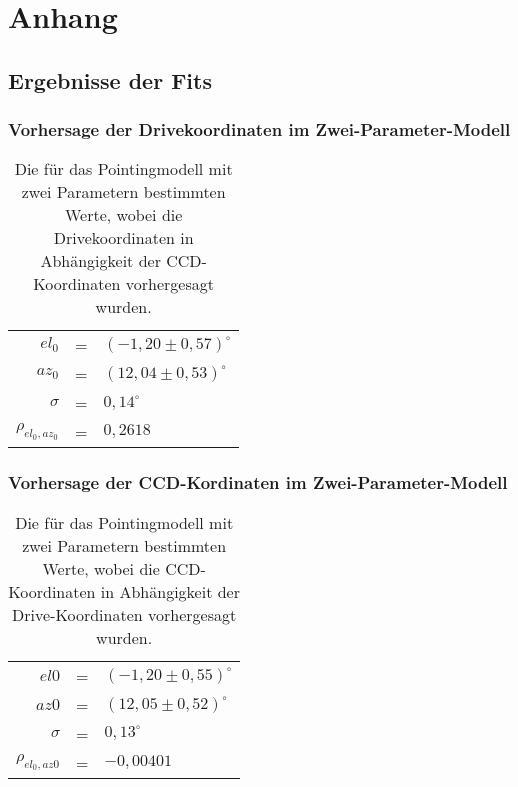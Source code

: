 \chapter{Anhang}
\section*{Ergebnisse der Fits}
\subsection*{Vorhersage der Drivekoordinaten im Zwei-Parameter-Modell}
\begin{table}[htbp]
\centering
\begin{tabular}{rcl}
\toprule
$el_0$ &=& $(-1,20\pm0,57)^{\circ}$\\
$az_0$ &=& $(12,04\pm0,53)^{\circ}$\\
$\sigma$ &=& $0,14^{\circ}$\\
$\rho_{el_0,az_0}$ &=& $0,2618$\\
\bottomrule
\end{tabular}
\caption{Die für das Pointingmodell mit zwei Parametern bestimmten Werte, wobei die Drivekoordinaten in Abhängigkeit der CCD-Koordinaten vorhergesagt wurden.}
\label{tab:C2D-}
\end{table}
\subsection*{Vorhersage der CCD-Kordinaten im Zwei-Parameter-Modell}
\begin{table}[htbp]
\centering
\begin{tabular}{rcl}
\toprule
$el0$ &=& $(-1,20\pm0,55)^{\circ}$\\
$az0$ &=& $(12,05\pm0,52)^{\circ}$\\
$\sigma$ &=& $0,13^{\circ}$\\
$\rho_{el_0,az0}$ &=& $-0,00401$\\
\bottomrule
\end{tabular}
\caption{Die für das Pointingmodell mit zwei Parametern bestimmten Werte, wobei die CCD-Koordinaten in Abhängigkeit der Drive-Koordinaten vorhergesagt wurden.}
\label{tab:D2C-}
\end{table}
